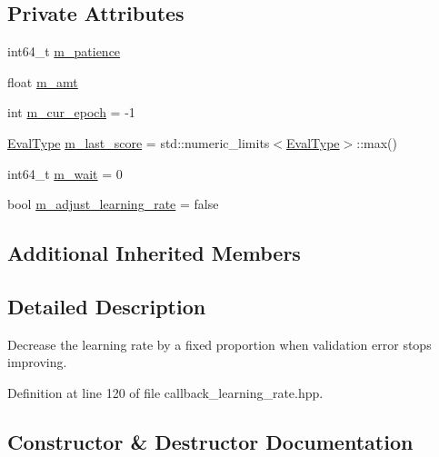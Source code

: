 \subsection*{Private Attributes}
\begin{DoxyCompactItemize}
\item 
int64\+\_\+t \hyperlink{classlbann_1_1lbann__callback__adaptive__learning__rate_ac3ac3c4d34d62608c54dfa3a41691217}{m\+\_\+patience}
\item 
float \hyperlink{classlbann_1_1lbann__callback__adaptive__learning__rate_ab9c76371184664ccd8e240e3b16a9736}{m\+\_\+amt}
\item 
int \hyperlink{classlbann_1_1lbann__callback__adaptive__learning__rate_a740b8b3bbb47312b48322f440f703222}{m\+\_\+cur\+\_\+epoch} = -\/1
\item 
\hyperlink{base_8hpp_a3266f5ac18504bbadea983c109566867}{Eval\+Type} \hyperlink{classlbann_1_1lbann__callback__adaptive__learning__rate_a7aa8aeed3df9cca131ace1ea9fbf1cd3}{m\+\_\+last\+\_\+score} = std\+::numeric\+\_\+limits$<$\hyperlink{base_8hpp_a3266f5ac18504bbadea983c109566867}{Eval\+Type}$>$\+::max()
\item 
int64\+\_\+t \hyperlink{classlbann_1_1lbann__callback__adaptive__learning__rate_aecfb70e4a366762305a2dbd8248471de}{m\+\_\+wait} = 0
\item 
bool \hyperlink{classlbann_1_1lbann__callback__adaptive__learning__rate_aa3de3b7d67b5295058e9c2175d06212d}{m\+\_\+adjust\+\_\+learning\+\_\+rate} = false
\end{DoxyCompactItemize}
\subsection*{Additional Inherited Members}


\subsection{Detailed Description}
Decrease the learning rate by a fixed proportion when validation error stops improving. 

Definition at line 120 of file callback\+\_\+learning\+\_\+rate.\+hpp.



\subsection{Constructor \& Destructor Documentation}
\mbox{\label{classlbann_1_1lbann__callback__adaptive__learning__rate_a2095e4c430b3c4f206e85c963e1ec2aa}} 
